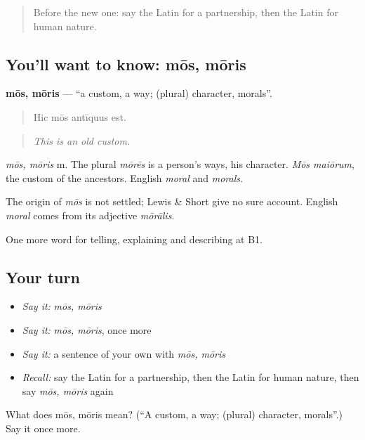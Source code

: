 \label{lesson:LA-C386-mos}



\begin{quote}
Before the new one: say the Latin for a partnership, then the Latin for human nature.
\end{quote}

\subsection*{You'll want to know: mōs, mōris}
\textbf{mōs, mōris} — \textquotedblleft{}a custom, a way; (plural) character, morals\textquotedblright{}.

\begin{quote}
Hic mōs antīquus est.
\end{quote}

\begin{quote}
\emph{This is an old custom.}
\end{quote}

\emph{mōs, mōris} m. The plural \emph{mōrēs} is a person's ways, his character. \emph{Mōs maiōrum}, the custom of the ancestors. English \emph{moral} and \emph{morals}.

\begin{cousinweb}
The origin of \emph{mōs} is not settled; Lewis \& Short give no sure account. English \emph{moral} comes from its adjective \emph{mōrālis}.
\end{cousinweb}

\begin{grammarlens}[title={What you've built}]
One more word for telling, explaining and describing at B1.
\end{grammarlens}

\subsection*{Your turn}
\begin{itemize}
\raggedright
  \item \emph{Say it:} \emph{mōs, mōris}
  \item \emph{Say it:} \emph{mōs, mōris}, once more
  \item \emph{Say it:} a sentence of your own with \emph{mōs, mōris}
  \item \emph{Recall:} say the Latin for a partnership, then the Latin for human nature, then say \emph{mōs, mōris} again
\end{itemize}

\begin{tcolorbox}[breakable,colback=teal!4,colframe=teal!35!black,title={Before you move on}]
What does mōs, mōris mean? (\textquotedblleft{}A custom, a way; (plural) character, morals\textquotedblright{}.) Say it once more.
\end{tcolorbox}
